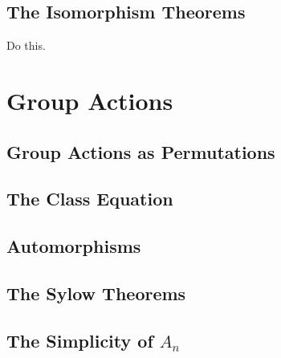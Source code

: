 \documentclass[10pt]{report}
\begin{document}
\section{The Isomorphism Theorems}

{\color{red}Do this.}



\chapter{Group Actions}


\section{Group Actions as Permutations}



\section{The Class Equation}



\section{Automorphisms}



\section{The Sylow Theorems}



\section{The Simplicity of \texorpdfstring{$A_n$}{the Alternating Group}}



\end{document}
